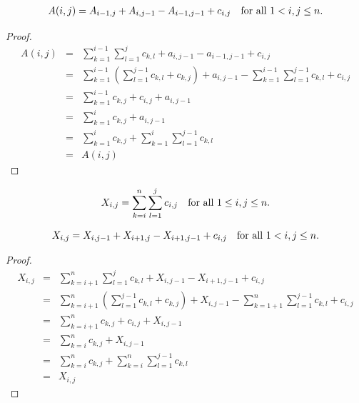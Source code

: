 \documentclass[AMA,LATO1COL]{WileyNJD-v2}
\begin{document}
\begin{lemma}
\begin{eqnarray}
A(i,j)=A_{i-1,j}+A_{i,j-1}-A_{i-1,j-1}+c_{i,j} \mbox{\quad for all $1<i,j\leq n$}.
\end{eqnarray}
\end{lemma}

\begin{proof}
\begin{eqnarray}
A(i,j)& = & \sum_{k=1}^{i-1}\sum_{l=1}^{j}c_{k,l}+a_{i,j-1}-a_{i-1,j-1}+c_{i,j}\\
 & = & \sum_{k=1}^{i-1}\left(\sum_{l=1}^{j-1}c_{k,l}+c_{k,j}\right)+a_{i,j-1}-\sum_{k=1}^{i-1}\sum_{l=1}^{j-1}c_{k,l}+c_{i,j}\\
 & = & \sum_{k=1}^{i-1}c_{k,j}+c_{i,j}+a_{i,j-1}\\
 & = & \sum_{k=1}^{i}c_{k,j}+a_{i,j-1}\\
 & = & \sum_{k=1}^{i}c_{k,j}+\sum_{k=1}^{i}\sum_{l=1}^{j-1}c_{k,l}\\
 & = & A(i,j)
\end{eqnarray}

\end{proof}

\begin{definition}
\begin{equation}
X_{i,j}=\sum_{k=i}^{n}\sum_{l=1}^{j}c_{i,j}\mbox{\quad for all $1\leq i,j\leq n$}.
\end{equation}
\end{definition}

\begin{lemma}
\begin{equation}
X_{i,j}=X_{i,j-1}+X_{i+1,j}-X_{i+1,j-1}+c_{i,j} \mbox{\quad for all $1<i,j\leq n$}.
\end{equation}
\end{lemma}

\begin{proof}
\begin{eqnarray*}
X_{i,j}& = & \sum_{k=i+1}^{n}\sum_{l=1}^{j}c_{k,l}+X_{i,j-1}-X_{i+1,j-1}+c_{i,j}\\
 & = & \sum_{k=i+1}^{n}\left(\sum_{l=1}^{j-1}c_{k,l}+c_{k,j}\right)+X_{i,j-1}-\sum_{k=1+1}^{n}\sum_{l=1}^{j-1}c_{k,l}+c_{i,j}\\
 & = & \sum_{k=i+1}^{n}c_{k,j}+c_{i,j}+X_{i,j-1}\\
 & = & \sum_{k=i}^{n}c_{k,j}+X_{i,j-1}\\
 & = & \sum_{k=i}^{n}c_{k,j}+\sum_{k=i}^{n}\sum_{l=1}^{j-1}c_{k,l}\\
 & = & X_{i,j}
\end{eqnarray*}
\end{proof}
\end{document}
